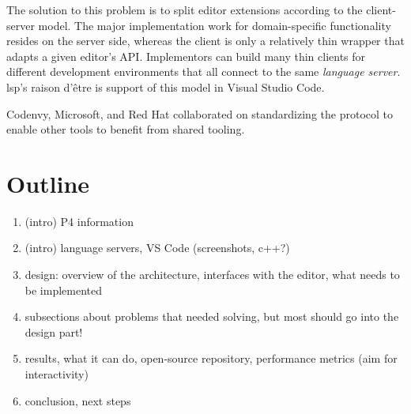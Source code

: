The solution to this problem is to split editor extensions according to the
client-server model. The major implementation work for domain-specific
functionality resides on the server side, whereas the client is only a
relatively thin wrapper that adapts a given editor's API. Implementors can build
many thin clients for different development environments that all connect to the
same \emph{language server}. \acrshort{lsp}'s raison d'être is support of this
model in Visual Studio Code.

Coden\-vy, Microsoft, and Red Hat collaborated on standardizing the protocol to
enable other tools to benefit from shared
tooling\cite{sdtimesCodenvyMicrosoft,infoworldMicrosoftbackedLanguage}.

\section{Outline}

\begin{enumerate}
	\item (intro) P4 information
	\item (intro) language servers, VS Code (screenshots, c++?)
	\item design: overview of the architecture, interfaces with the editor, what
		needs to be implemented
	\item subsections about problems that needed solving, but most should go into
		the design part!
	\item results, what it can do, open-source repository, performance metrics
		(aim for interactivity)
	\item conclusion, next steps
\end{enumerate}










